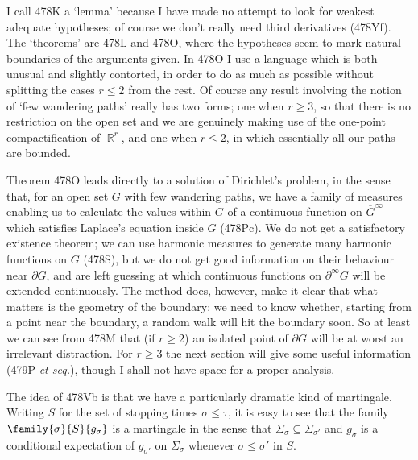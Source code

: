 {I call 478K a `lemma' because I have made no attempt to look for weakest
adequate hypotheses;  of course we don't really need third derivatives
(478Yf).
The `theorems' are 478L and 478O, where the hypotheses seem to mark
natural boundaries of the arguments given.   In 478O %
I use a language which is both unusual and slightly contorted, in
order to do as much as possible without splitting the cases $r\le 2$ from
the rest.   Of course any result involving the notion of `few wandering
paths' really has two forms;  one when $r\ge 3$, so that there is no
restriction on the open set and we are genuinely making use of the
one-point
compactification of $\BbbR^r$, and one when $r\le 2$, in which essentially
all our paths are bounded.

Theorem 478O leads directly to a solution of Dirichlet's problem, in the
sense that, for an open set $G$ with few wandering paths, we have a
family of measures enabling us to
calculate the values within $G$ of a continuous function on
$\overline{G}^{\infty}$ which satisfies Laplace's equation inside $G$
(478Pc).   We do not get a satisfactory existence theorem;  we can
use harmonic measures to generate
many harmonic functions on $G$ (478S), but
we do not get good information on their behaviour near $\partial G$, and
are left guessing at which continuous functions on $\partial^{\infty}G$
will be extended continuously.   The method does, however, make it clear
that what matters is the geometry of the boundary;  we need to know
whether, starting from a point near the boundary, a random walk will hit
the boundary soon.   So at least we can see from 478M that (if $r\ge 2$) an
isolated point of $\partial G$ will be at worst an irrelevant distraction.
For $r\ge 3$ the next section will give some useful information
(479P {\it
et seq.}), though I shall not have space for a proper analysis.

The idea of 478Vb is that we have a particularly dramatic kind of
martingale.   Writing $S$ for the set of stopping times $\sigma\le\tau$,
it is easy to see that the family
$\family{\sigma}{S}{g_{\sigma}}$ is a martingale in the sense that
$\Sigma_{\sigma}\subseteq\Sigma_{\sigma'}$
and $g_{\sigma}$ is a conditional expectation of $g_{\sigma'}$ on
$\Sigma_{\sigma}$  whenever $\sigma\le\sigma'$ in $S$.
}

\discrpage


